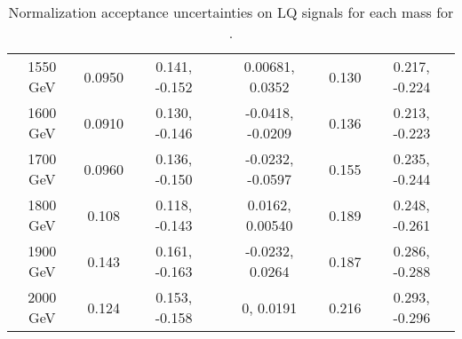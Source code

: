 \begin{table}
\begin{tabular}{|c|c|c|c|c|c|}
1550 GeV & 0.0950 & 0.141, -0.152 & 0.00681,  0.0352 &  0.130 & 0.217, -0.224 \\
1600 GeV & 0.0910 & 0.130, -0.146 & -0.0418, -0.0209 &  0.136 & 0.213, -0.223 \\
1700 GeV & 0.0960 & 0.136, -0.150 & -0.0232, -0.0597 &  0.155 & 0.235, -0.244 \\
1800 GeV &  0.108 & 0.118, -0.143 &  0.0162, 0.00540 &  0.189 & 0.248, -0.261 \\
1900 GeV &  0.143 & 0.161, -0.163 & -0.0232,  0.0264 &  0.187 & 0.286, -0.288 \\
2000 GeV &  0.124 & 0.153, -0.158 &       0,  0.0191 &  0.216 & 0.293, -0.296 \\
\hline
\end{tabular}
\caption{Normalization acceptance uncertainties on LQ signals for each mass for \lephad.}
\label{sec:systs:tab:systematics_normalisations_LQ_lephad}
\end{table}

